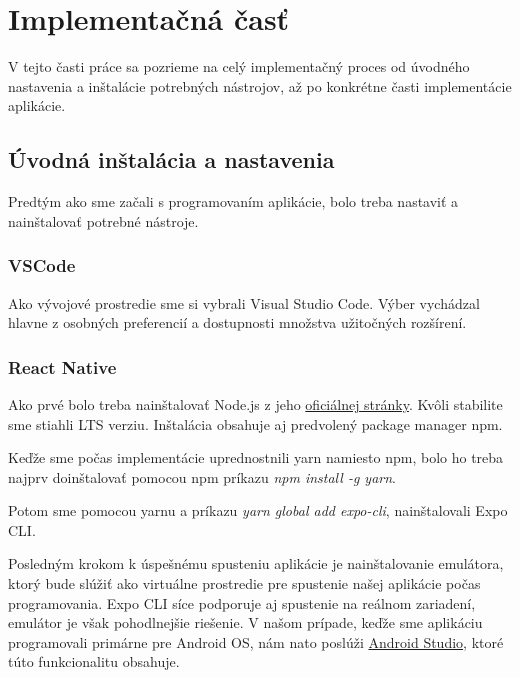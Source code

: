 
\section{Implementačná časť}
V tejto časti práce sa pozrieme na celý implementačný proces od úvodného nastavenia a inštalácie potrebných nástrojov, až po konkrétne časti implementácie aplikácie.

\subsection{Úvodná inštalácia a nastavenia}
Predtým ako sme začali s programovaním aplikácie, bolo treba nastaviť a nainštalovať potrebné nástroje.
\subsubsection{VSCode}
Ako vývojové prostredie sme si vybrali Visual Studio Code. Výber vychádzal hlavne z osobných preferencií a dostupnosti množstva užitočných rozšírení.
\subsubsection{React Native}
\begin{itemize}
{\item Ako prvé bolo treba nainštalovať Node.js z jeho \href{https://nodejs.org/en/download/}{oficiálnej stránky}. Kvôli stabilite sme stiahli LTS verziu. Inštalácia obsahuje aj predvolený package manager npm.} 
{\item Keďže sme počas implementácie uprednostnili yarn namiesto npm, bolo ho treba najprv doinštalovať pomocou npm príkazu \textit{npm install -g yarn}.} 
{\item Potom sme pomocou yarnu a príkazu \textit{yarn global add expo-cli}, nainštalovali Expo CLI.} 
{\item Posledným krokom k úspešnému spusteniu aplikácie je nainštalovanie emulátora, ktorý bude slúžiť ako virtuálne prostredie pre spustenie našej aplikácie počas programovania. Expo CLI síce podporuje aj spustenie na reálnom zariadení, emulátor je však pohodlnejšie riešenie. V našom prípade, keďže sme aplikáciu programovali primárne pre Android OS, nám nato poslúži \href{https://developer.android.com/studio}{Android Studio}, ktoré túto funkcionalitu obsahuje.}
\end{itemize}

